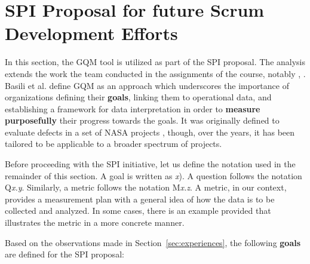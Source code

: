 \documentclass[conference]{IEEEtran}
\begin{document}
\section{SPI Proposal for future Scrum Development Efforts}
\label{sec:proposal}


In this section, the {\selectfont GQM} tool is utilized as part
of the SPI proposal. The analysis extends the work the team conducted in the
assignments of the course, notably \cite{DIT348A3}, \cite{DIT348A4}. Basili et
al. \cite{Caldiera1994} define GQM as an approach which underscores the
importance of organizations defining their \textbf{goals}, linking them to
operational data, and establishing a framework for data interpretation in order
to \textbf{measure purposefully} their progress towards the goals. It was
originally defined to evaluate defects in a set of NASA projects
\cite{Caldiera1994}, though, over the years, it has been tailored to be
applicable to a broader spectrum of projects.

Before proceeding with the SPI initiative, let us define the notation used in
the remainder of this section. A goal is written as \textit{x}). A question
follows the notation Q\textit{x.y}. Similarly, a metric follows the notation
M\textit{x.z}. A metric, in our context, provides a measurement plan with a
general idea of how the data is to be collected and analyzed. In some cases,
there is an example provided that illustrates the metric in a more concrete
manner.

Based on the observations made in Section~\ref{sec:experiences}, the following
\textbf{goals} are defined for the SPI proposal:

\noindent{}
\end{document}
